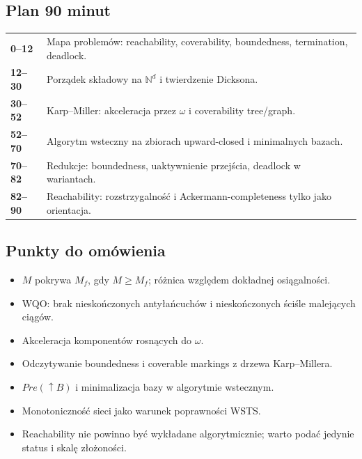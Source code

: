 \documentclass[11pt,a4paper]{article}
\begin{document}
\subsection{Plan 90 minut}
\begin{center}\small\begin{tabularx}{0.96\textwidth}{@{}>{\bfseries}p{18mm}X@{}}
0--12 & Mapa problemów: reachability, coverability, boundedness, termination, deadlock.\\
12--30 & Porządek składowy na $\mathbb{N}^d$ i twierdzenie Dicksona.\\
30--52 & Karp--Miller: akceleracja przez $\omega$ i coverability tree/graph.\\
52--70 & Algorytm wsteczny na zbiorach upward-closed i minimalnych bazach.\\
70--82 & Redukcje: boundedness, uaktywnienie przejścia, deadlock w wariantach.\\
82--90 & Reachability: rozstrzygalność i Ackermann-completeness tylko jako orientacja.\\
\end{tabularx}\end{center}

\subsection{Punkty do omówienia}
\begin{itemize}
\item $M$ pokrywa $M_f$, gdy $M\geq M_f$; różnica względem dokładnej osiągalności.
\item WQO: brak nieskończonych antyłańcuchów i nieskończonych ściśle malejących ciągów.
\item Akceleracja komponentów rosnących do $\omega$.
\item Odczytywanie boundedness i coverable markings z drzewa Karp--Millera.
\item $Pre(\uparrow B)$ i minimalizacja bazy w algorytmie wstecznym.
\item Monotoniczność sieci jako warunek poprawności WSTS.
\item Reachability nie powinno być wykładane algorytmicznie; warto podać jedynie status i skalę złożoności.
\end{itemize}
\end{document}
